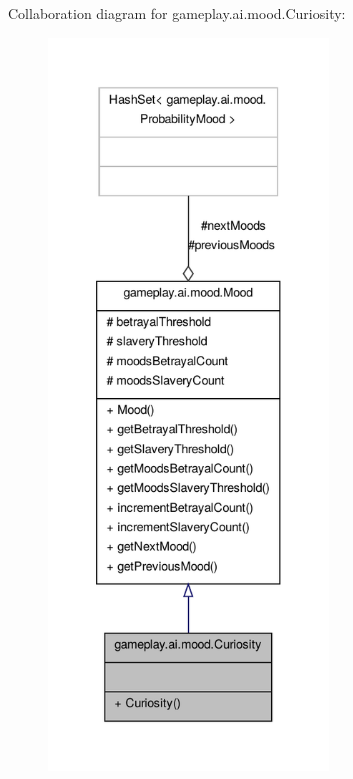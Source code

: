 Collaboration diagram for gameplay.\-ai.\-mood.\-Curiosity\-:
\nopagebreak
\begin{figure}[H]
\begin{center}
\leavevmode
\includegraphics[height=550pt]{a00105}
\end{center}
\end{figure}
